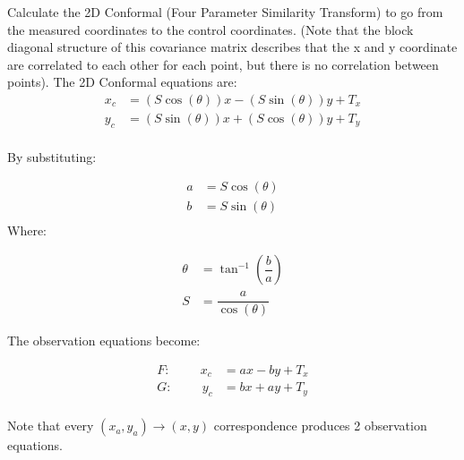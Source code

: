 Calculate the 2D Conformal (Four Parameter Similarity Transform) to go from the measured coordinates to the control coordinates.  (Note that the block diagonal structure of this covariance matrix describes that the x and y coordinate are correlated to each other for each point, but there is no correlation between points).  The 2D Conformal equations are:
\begin{align*}
x_c &= (S\cos(\theta))x - (S\sin(\theta))y + T_x \\
y_c &= (S\sin(\theta))x + (S\cos(\theta))y + T_y \\
\end{align*}

By substituting: 

\begin{align*}
	a &= S\cos(\theta) \\
	b &= S\sin(\theta) \\
\end{align*}
Where:

\begin{align*}
	\theta &= \tan^{-1}(\dfrac{b}{a}) \\
	S &= \dfrac{a}{\cos(\theta)}
\end{align*}

The observation equations become:

\begin{align*}
	F: \hspace{1cm} x_c &= ax - by + T_x \\
	G: \hspace{1cm} y_c &= bx + ay + T_y \\
\end{align*}

Note that every $(x_a,y_a)\rightarrow(x,y)$ correspondence produces 2 observation equations.

